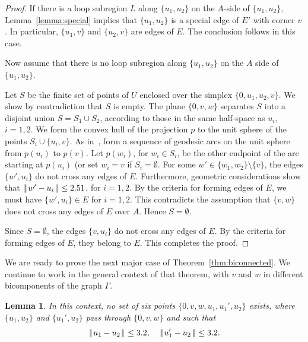\documentclass[11pt]{amsart}
\def\|{{\hskip0.1em|\hskip-0.15em|\hskip0.1em}}
\newtheorem{lemma}{Lemma}
\begin{document}
\begin{proof} If
there is a loop subregion $L$ along 
$\{u_1,u_2\}$ on the $A$-side
of $\{u_1,u_2\}$, Lemma~\ref{lemma:special} implies that
$\{u_1,u_2\}$ is a special edge of $E'$ with
corner $v$.  In particular, $\{u_1,v\}$ and $\{u_2,v\}$ are
edges of $E$. The conclusion follows in this case.


 Now assume that there is no loop subregion along
$\{u_1,u_2\}$ on the $A$ side of $\{u_1,u_2\}$.

Let $S$ be the finite set of points of $U$ enclosed
over the simplex $\{0,u_1,u_2,v\}$.  We show by contradiction
that $S$ is empty.
The plane $\{0,v,w\}$ separates
$S$ into a disjoint union $S = S_1\cup S_2$, according to those
in the same half-space as $u_i$, $i=1,2$.
We form the convex hull of the projection $p$ to the unit sphere of the 
points $S_i\cup\{u_i,v\}$.  As in~\cite[\S12.13]{Hales:2006:DCG:4},
form a sequence of geodesic arcs on the unit sphere from $p(u_i)$
to $p(v)$.  Let $p(w_i)$, for $w_i\in S_i$, be the other endpoint
of the arc starting at $p(u_i)$ (or set $w_i=v$ if $S_i=\emptyset$.  
For some $w'\in\{w_1,w_2\}\setminus\{v\}$,  the edges $\{w',u_i\}$ do not cross any edges
of $E$.  Furthermore, geometric considerations show that
$\|w'-u_i\|\le 2.51$, for $i=1,2$.  By the criteria for forming
edges of $E$, we must have $\{w',u_i\}\in E$ for $i=1,2$.  This
contradicts the assumption that $\{v,w\}$ does not cross any edges
of $E$ over $A$.  Hence $S=\emptyset$.

Since $S=\emptyset$, the edges $\{v,u_i\}$ do not cross any edges
of $E$.  By the criteria for forming edges of $E$, they belong to $E$.
This completes the proof.
\end{proof}

We are ready to prove the next major case of Theorem~\ref{thm:biconnected}.
We continue to work in the general context of that theorem, with $v$ and $w$
in different bicomponents of the graph $\Gamma$.

\begin{lemma}\label{lemma:double-cross}  
In this context, no set of six points $\{0,v,w,u_1,u_1',u_2\}$ exists,
where $\{u_1,u_2\}$ and $\{u_1',u_2\}$ pass through $\{0,v,w\}$ and such that
  $$\|u_1-u_2\|\le 3.2,\quad \|u_1'-u_2\|\le 3.2.$$
\end{lemma}
\end{document}
